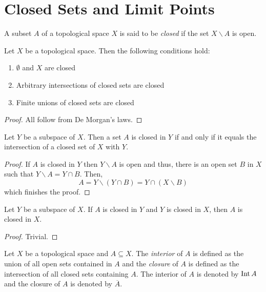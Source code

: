 \section{Closed Sets and Limit Points}
\begin{definition}
    A subset $A$ of a topological space $X$ is said to be \textit{closed} if the set $X\backslash A$ is open.
\end{definition}

\begin{theorem}
    Let $X$ be a topological space. Then the following conditions hold:
    \begin{enumerate}
        \item $\emptyset$ and $X$ are closed 
        \item Arbitrary intersections of closed sets are closed 
        \item Finite unions of closed sets are closed
    \end{enumerate}
\end{theorem}
\begin{proof}
    All follow from De Morgan's laws.
\end{proof}

\begin{proposition}
    Let $Y$ be a subspace of $X$. Then a set $A$ is closed in $Y$ if and only if it equals the intersection of a closed set of $X$ with $Y$.
\end{proposition}
\begin{proof}
    If $A$ is closed in $Y$ then $Y\backslash A$ is open and thus, there is an open set $B$ in $X$ such that $Y\backslash A = Y\cap B$. Then,
    \begin{equation*}
        A = Y\backslash(Y\cap B) = Y\cap(X\backslash B)
    \end{equation*}
    which finishes the proof.
\end{proof}

\begin{corollary}
    Let $Y$ be a subspace of $X$. If $A$ is closed in $Y$ and $Y$ is closed in $X$, then $A$ is closed in $X$.
\end{corollary}
\begin{proof}
    Trivial.
\end{proof}

\begin{definition}
    Let $X$ be a topological space and $A\subseteq X$. The \textit{interior} of $A$ is defined as the union of all open sets contained in $A$ and the \textit{closure} of $A$ is defined as the intersection of all closed sets containing $A$. The interior of $A$ is denoted by $\operatorname{Int} A$ and the closure of $A$ is denoted by $\overline{A}$.
\end{definition}


